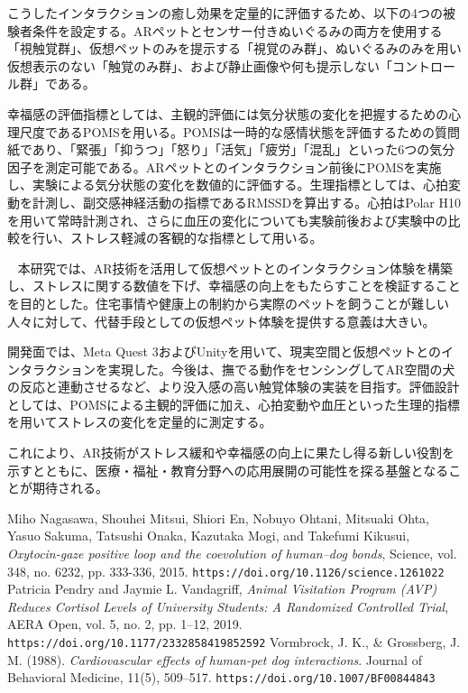 \documentclass[a4j]{ltjsarticle}
\newcounter{seccnt}
\newcommand{\usection}[1]{\ \newline{\bf\underline{\theseccnt\stepcounter{seccnt}. #1}\hspace{10pt}}}
\begin{document}
こうしたインタラクションの癒し効果を定量的に評価するため、以下の4つの被験者条件を設定する。ARペットとセンサー付きぬいぐるみの両方を使用する「視触覚群」、仮想ペットのみを提示する「視覚のみ群」、ぬいぐるみのみを用い仮想表示のない「触覚のみ群」、および静止画像や何も提示しない「コントロール群」である。

幸福感の評価指標としては、主観的評価には気分状態の変化を把握するための心理尺度であるPOMSを用いる。POMSは一時的な感情状態を評価するための質問紙であり、「緊張」「抑うつ」「怒り」「活気」「疲労」「混乱」といった6つの気分因子を測定可能である。ARペットとのインタラクション前後にPOMSを実施し、実験による気分状態の変化を数値的に評価する。生理指標としては、心拍変動を計測し、副交感神経活動の指標であるRMSSDを算出する。心拍はPolar H10を用いて常時計測され、さらに血圧の変化についても実験前後および実験中の比較を行い、ストレス軽減の客観的な指標として用いる。


\usection{まとめ}
本研究では、AR技術を活用して仮想ペットとのインタラクション体験を構築し、ストレスに関する数値を下げ、幸福感の向上をもたらすことを検証することを目的とした。住宅事情や健康上の制約から実際のペットを飼うことが難しい人々に対して、代替手段としての仮想ペット体験を提供する意義は大きい。

開発面では、Meta Quest 3およびUnityを用いて、現実空間と仮想ペットとのインタラクションを実現した。今後は、撫でる動作をセンシングしてAR空間の犬の反応と連動させるなど、より没入感の高い触覚体験の実装を目指す。評価設計としては、POMSによる主観的評価に加え、心拍変動や血圧といった生理的指標を用いてストレスの変化を定量的に測定する。

これにより、AR技術がストレス緩和や幸福感の向上に果たし得る新しい役割を示すとともに、医療・福祉・教育分野への応用展開の可能性を探る基盤となることが期待される。

\small
\begin{thebibliography}{9}
 Miho Nagasawa, Shouhei Mitsui, Shiori En, Nobuyo Ohtani, Mitsuaki Ohta, Yasuo Sakuma, Tatsushi Onaka, Kazutaka Mogi, and Takefumi Kikusui, 
\textit{Oxytocin-gaze positive loop and the coevolution of human–dog bonds}, 
Science, vol. 348, no. 6232, pp. 333-336, 2015.
\texttt{https://doi.org/10.1126/science.1261022}
 Patricia Pendry and Jaymie L. Vandagriff, 
\textit{Animal Visitation Program (AVP) Reduces Cortisol Levels of University Students: A Randomized Controlled Trial}, 
AERA Open, vol. 5, no. 2, pp. 1–12, 2019.
\texttt{https://doi.org/10.1177/2332858419852592}
Vormbrock, J. K., \& Grossberg, J. M. (1988).
\textit{Cardiovascular effects of human-pet dog interactions}.
Journal of Behavioral Medicine, 11(5), 509–517.
\texttt{https://doi.org/10.1007/BF00844843}

\end{thebibliography}
\end{document}
